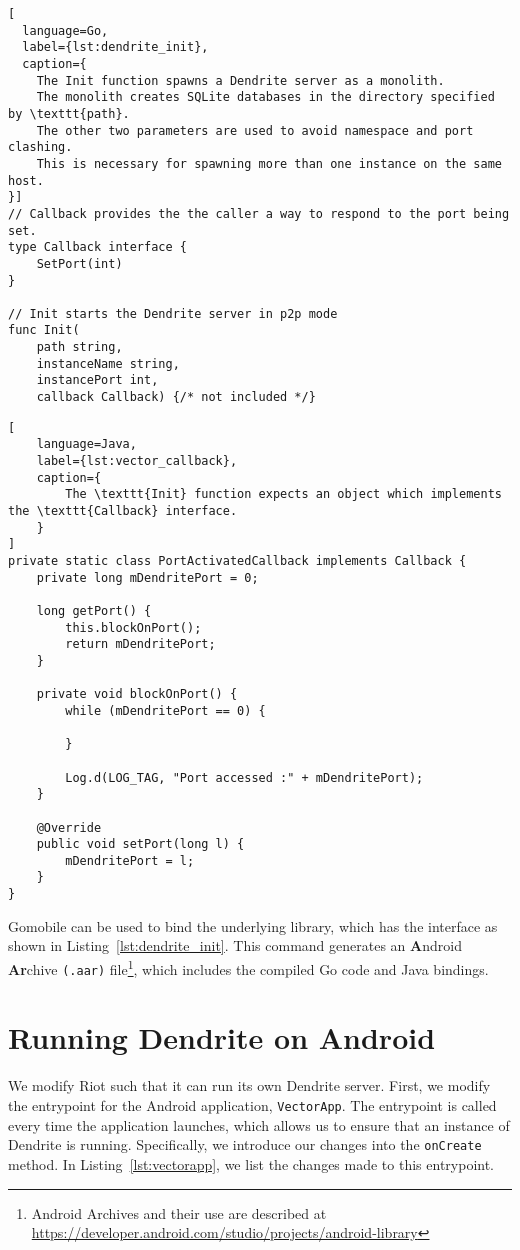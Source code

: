 \begin{lstfloat}
	\begin{lstlisting}[
  language=Go,
  label={lst:dendrite_init},
  caption={
    The Init function spawns a Dendrite server as a monolith.
    The monolith creates SQLite databases in the directory specified by \texttt{path}.
    The other two parameters are used to avoid namespace and port clashing.
    This is necessary for spawning more than one instance on the same host.
}]
// Callback provides the the caller a way to respond to the port being set.
type Callback interface {
	SetPort(int)
}

// Init starts the Dendrite server in p2p mode
func Init(
    path string, 
    instanceName string, 
    instancePort int, 
    callback Callback) {/* not included */}
\end{lstlisting}
\end{lstfloat}


\begin{lstfloat}
	\begin{lstlisting}[
    language=Java,
    label={lst:vector_callback},
    caption={
        The \texttt{Init} function expects an object which implements the \texttt{Callback} interface.
    }
]
private static class PortActivatedCallback implements Callback {
    private long mDendritePort = 0;

    long getPort() {
        this.blockOnPort();
        return mDendritePort;
    }

    private void blockOnPort() {
        while (mDendritePort == 0) {

        }

        Log.d(LOG_TAG, "Port accessed :" + mDendritePort);
    }

    @Override
    public void setPort(long l) {
        mDendritePort = l;
    }
}
\end{lstlisting}
\end{lstfloat}

Gomobile can be used to bind the underlying library, which has the interface as shown in Listing~\ref{lst:dendrite_init}.
This command generates an \textbf{A}ndroid \textbf{Ar}chive \texttt{(.aar)} file\footnote{Android Archives and their use are described at \url{https://developer.android.com/studio/projects/android-library}}, which includes the compiled Go code and Java bindings.

\section{Running Dendrite on Android}
We modify Riot such that it can run its own Dendrite server.
First, we modify the entrypoint for the Android application, \texttt{VectorApp}.
The entrypoint is called every time the application launches, which allows us to ensure that an instance of Dendrite is running.
Specifically, we introduce our changes into the \texttt{onCreate} method.
In Listing~\ref{lst:vectorapp}, we list the changes made to this entrypoint.

